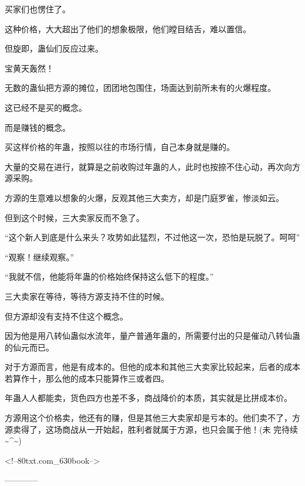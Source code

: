 \begin{this_body}
买家们也愣住了。

这种价格，大大超出了他们的想象极限，他们瞠目结舌，难以置信。

但旋即，蛊仙们反应过来。

宝黄天轰然！

无数的蛊仙把方源的摊位，团团地包围住，场面达到前所未有的火爆程度。

这已经不是买的概念。

而是赚钱的概念。

买这样价格的年蛊，按照以往的市场行情，自己本身就是赚的。

大量的交易在进行，就算是之前收购过年蛊的人，此时也按捺不住心动，再次向方源采购。

方源的生意难以想象的火爆，反观其他三大卖方，却是门庭罗雀，惨淡如云。

但到这个时候，三大卖家反而不急了。

“这个新人到底是什么来头？攻势如此猛烈，不过他这一次，恐怕是玩脱了。呵呵”

“观察！继续观察。”

“我就不信，他能将年蛊的价格始终保持这么低下的程度。”

三大卖家在等待，等待方源支持不住的时候。

但方源却没有支持不住这个概念。

因为他是用八转仙蛊似水流年，量产普通年蛊的，所需要付出的只是催动八转仙蛊的仙元而已。

对于方源而言，他是有成本的。但他的成本和其他三大卖家比较起来，后者的成本若算作十，那么他的成本只能算作三或者四。

年蛊人人都能卖，货色四方也差不多，商战降价的本质，其实就是比拼成本价。

方源用这个价格卖，他还有的赚，但是其他三大卖家却是亏本的。他们卖不了，方源卖得了，这场商战从一开始起，胜利者就属于方源，也只会属于他！(未 完待续 \~{}\^{}\~{})

<!--80txt.com\_630book-->

------------

\end{this_body}


